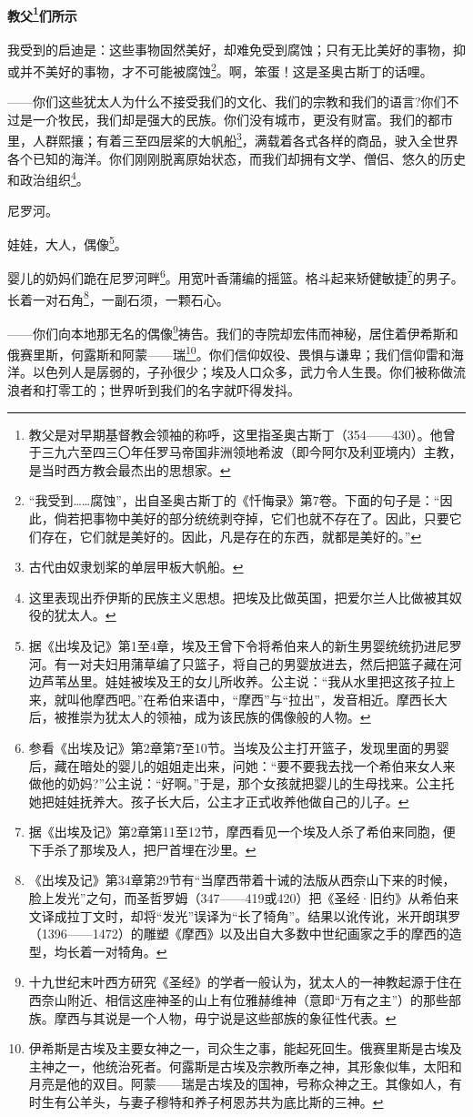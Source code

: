 \paragraph*{教父\footnote{教父是对早期基督教会领袖的称呼，这里指圣奥古斯丁（354——430）。他曾于三九六至四三〇年任罗马帝国非洲领地希波（即今阿尔及利亚境内）主教，是当时西方教会最杰出的思想家。}们所示}
\par 我受到的启迪是：这些事物固然美好，却难免受到腐蚀；只有无比美好的事物，抑或并不美好的事物，才不可能被腐蚀\footnote{“我受到……腐蚀”，出自圣奥古斯丁的《忏悔录》第7卷。下面的句子是：“因此，倘若把事物中美好的部分统统剥夺掉，它们也就不存在了。因此，只要它们存在，它们就是美好的。因此，凡是存在的东西，就都是美好的。”}。啊，笨蛋！这是圣奥古斯丁的话哩。
\par ——你们这些犹太人为什么不接受我们的文化、我们的宗教和我们的语言?你们不过是一介牧民，我们却是强大的民族。你们没有城市，更没有财富。我们的都市里，人群熙攘；有着三至四层桨的大帆船\footnote{古代由奴隶划桨的单层甲板大帆船。}，满载着各式各样的商品，驶入全世界各个已知的海洋。你们刚刚脱离原始状态，而我们却拥有文学、僧侣、悠久的历史和政治组织\footnote{这里表现出乔伊斯的民族主义思想。把埃及比做英国，把爱尔兰人比做被其奴役的犹太人。}。
\par 尼罗河。
\par 娃娃，大人，偶像\footnote{据《出埃及记》第1至4章，埃及王曾下令将希伯来人的新生男婴统统扔进尼罗河。有一对夫妇用蒲草编了只篮子，将自己的男婴放进去，然后把篮子藏在河边芦苇丛里。娃娃被埃及王的女儿所收养。公主说：“我从水里把这孩子拉上来，就叫他摩西吧。”在希伯来语中，“摩西”与“拉出”，发音相近。摩西长大后，被推崇为犹太人的领袖，成为该民族的偶像般的人物。}。
\par 婴儿的奶妈们跪在尼罗河畔\footnote{参看《出埃及记》第2章第7至10节。当埃及公主打开篮子，发现里面的男婴后，藏在暗处的婴儿的姐姐走出来，问她：“要不要我去找一个希伯来女人来做他的奶妈?”公主说：“好啊。”于是，那个女孩就把婴儿的生母找来。公主托她把娃娃抚养大。孩子长大后，公主才正式收养他做自己的儿子。}。用宽叶香蒲编的摇篮。格斗起来矫健敏捷\footnote{据《出埃及记》第2章第11至12节，摩西看见一个埃及人杀了希伯来同胞，便下手杀了那埃及人，把尸首埋在沙里。}的男子。长着一对石角\footnote{《出埃及记》第34章第29节有“当摩西带着十诫的法版从西奈山下来的时候，脸上发光”之句，而圣哲罗姆（347——419或420）把《圣经·旧约》从希伯来文译成拉丁文时，却将“发光”误译为“长了犄角”。结果以讹传讹，米开朗琪罗（1396——1472）的雕塑《摩西》以及出自大多数中世纪画家之手的摩西的造型，均长着一对犄角。}，一副石须，一颗石心。
\par ——你们向本地那无名的偶像\footnote{十九世纪末叶西方研究《圣经》的学者一般认为，犹太人的一神教起源于住在西奈山附近、相信这座神圣的山上有位雅赫维神（意即“万有之主”）的那些部族。摩西与其说是一个人物，毋宁说是这些部族的象征性代表。}祷告。我们的寺院却宏伟而神秘，居住着伊希斯和俄赛里斯，何露斯和阿蒙——瑞\footnote{伊希斯是古埃及主要女神之一，司众生之事，能起死回生。俄赛里斯是古埃及主神之一，他统治死者。何露斯是古埃及宗教所奉之神，其形象似隼，太阳和月亮是他的双目。阿蒙——瑞是古埃及的国神，号称众神之王。其像如人，有时生有公羊头，与妻子穆特和养子柯恩苏共为底比斯的三神。}。你们信仰奴役、畏惧与谦卑；我们信仰雷和海洋。以色列人是孱弱的，子孙很少；埃及人口众多，武力令人生畏。你们被称做流浪者和打零工的；世界听到我们的名字就吓得发抖。
